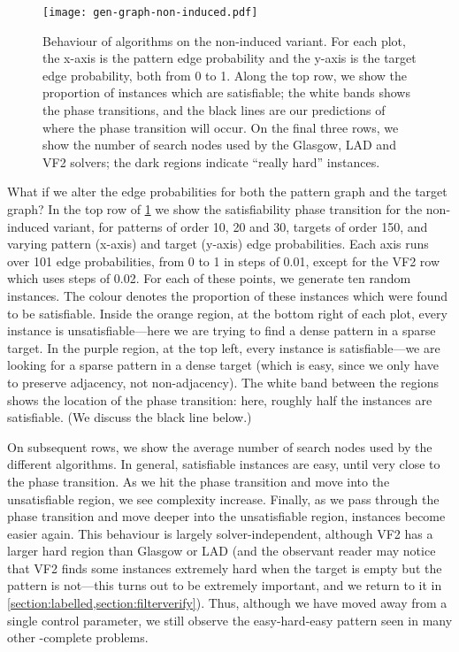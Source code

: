\documentclass[twoside,11pt]{article}
\begin{document}
\begin{figure}[tb]
    \centering\texttt{[image: gen-graph-non-induced.pdf]}
    \caption{Behaviour of algorithms on the non-induced variant. For each plot, the x-axis is the
        pattern edge probability and the y-axis is the target edge probability, both from 0 to 1.
        Along the top row, we show the proportion of instances which are satisfiable; the white
        bands shows the phase transitions, and the black lines are our predictions of where the
        phase transition will occur. On the final three rows, we show the number of search nodes used by the
        Glasgow, LAD and VF2 solvers; the dark regions indicate ``really hard'' instances.}
    \label{figure:non-induced}
\end{figure}

What if we alter the edge probabilities for both the pattern graph and the target graph?  In the top
row of \cref{figure:non-induced} we show the satisfiability phase transition for the non-induced
variant, for patterns of order 10, 20 and 30, targets of order 150, and varying pattern (x-axis) and
target (y-axis) edge probabilities. Each axis runs over 101 edge probabilities, from 0 to 1 in steps
of 0.01, except for the VF2 row which uses steps of 0.02. For each of these points, we generate ten
random instances. The colour denotes the proportion of these instances which were found to be
satisfiable.  Inside the orange region, at the bottom right of each plot, every instance is
unsatisfiable---here we are trying to find a dense pattern in a sparse target. In the purple region,
at the top left, every instance is satisfiable---we are looking for a sparse pattern in a dense
target (which is easy, since we only have to preserve adjacency, not non-adjacency). The white band
between the regions shows the location of the phase transition: here, roughly half the instances are
satisfiable. (We discuss the black line below.)

On subsequent rows, we show the average number of search nodes used by the different algorithms. In
general, satisfiable instances are easy, until very close to the phase transition. As we hit the
phase transition and move into the unsatisfiable region, we see complexity increase. Finally, as
we pass through the phase transition and move deeper into the unsatisfiable region, instances become
easier again. This behaviour is largely solver-independent, although VF2 has a larger hard region
than Glasgow or LAD (and the observant reader may notice that VF2 finds some instances extremely
hard when the target is empty but the pattern is not---this turns out to be extremely important, and
we return to it in \cref{section:labelled,section:filterverify}). Thus, although we have moved away
from a single control parameter, we still observe the easy-hard-easy pattern seen in many other
\NP-complete problems.
\end{document}
